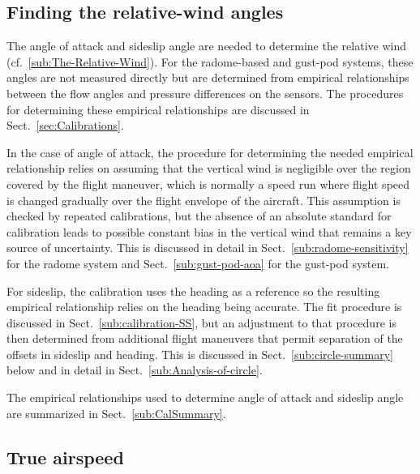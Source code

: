 \documentclass[12pt,twoside,english]{article}\usepackage[]{graphicx}\usepackage[]{color}
\let\OrgIndex\index
\renewcommand*{\index}[1]{\OrgIndex{#1}}
\begin{document}
{{\subsection{Finding the relative-wind angles}

The angle of attack and sideslip angle are needed to determine the relative wind (cf.~\ref{sub:The-Relative-Wind}). For the radome-based and gust-pod systems, these angles are not measured directly but are determined from empirical relationships between the flow angles and pressure differences on the sensors. The procedures for determining these empirical relationships are discussed in Sect.~\ref{sec:Calibrations}. 

In the case of angle of attack, the procedure for determining the needed empirical relationship relies on assuming that the vertical wind is negligible over the region covered by the flight maneuver, which is normally a \textquotedbl{}speed run\textquotedbl{} where flight speed is changed gradually over the flight envelope of the aircraft. This assumption is checked by repeated calibrations, but the absence of an absolute standard for calibration leads to possible constant bias in the vertical wind that remains a key source of uncertainty. This is discussed in detail in Sect.~\ref{sub:radome-sensitivity} for the radome system and Sect.~\ref{sub:gust-pod-aoa} for the gust-pod system. 

For sideslip, the calibration uses the heading as a reference so the resulting empirical relationship relies on the heading being accurate. The fit procedure is discussed in Sect.~\ref{sub:calibration-SS}, but an adjustment to that procedure is then determined from additional flight maneuvers that permit separation of the offsets in sideslip and heading. This is discussed in Sect.~\ref{sub:circle-summary} below and in detail in Sect.~\ref{sub:Analysis-of-circle}. 

The empirical relationships used to determine angle of attack and sideslip angle are summarized in Sect.~\ref{sub:CalSummary}. 

\subsection{True airspeed}

}}
\end{document}
